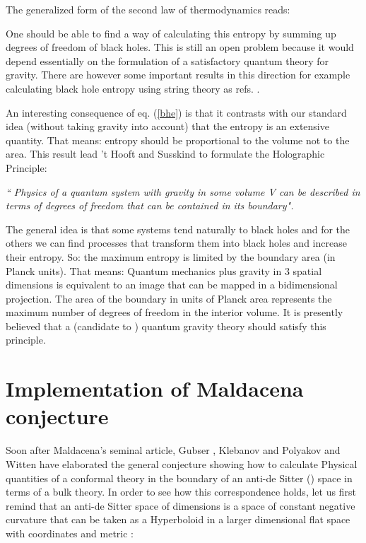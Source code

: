 \documentclass[a4paper,twocolumn,prd,groupedaddress,nofootinbib]{revtex4}
\begin{document}
\bigskip

\noindent The generalized form of the second law of thermodynamics reads:

\bigskip

\coordHE{}

\bigskip
One should be able to find a way of calculating this entropy by summing up degrees 
of freedom of black holes. This is still an open problem because it would
depend essentially on the formulation of a satisfactory quantum theory for gravity. 
There are however some important results in 
this direction for example calculating black hole entropy using string theory as 
refs. \cite{BHE1,BHE2}.



An interesting consequence of eq. (\ref{bhe}) is that it contrasts with our standard
idea (without taking gravity into account) that the entropy 
is an extensive quantity. That means: entropy should be proportional to the  
volume not to the area.  This result lead 't Hooft and Susskind to formulate 
the Holographic  Principle:

{\it `` Physics of a quantum system with gravity in some \break volume V
can be described in terms of degrees of \break freedom that can be contained
in its boundary".}

\bigskip

\noindent  The general idea is that some systems tend naturally to black holes and
for the others we can find processes that transform them into black holes and increase 
their entropy. So: the maximum entropy is limited by the boundary area (in Planck units). 
That means:  Quantum mechanics plus gravity in 3 spatial dimensions is equivalent 
to an image that can be mapped  in a bidimensional projection.
The area of the boundary in units of  Planck area represents 
the  maximum number of degrees of freedom in the interior volume.
It is presently believed that a (candidate to ) quantum gravity theory
should satisfy this principle.

\vskip 1cm

\section{Implementation of Maldacena conjecture}

\bigskip
Soon after Maldacena's seminal article, Gubser , Klebanov and Polyakov\cite{GKP} and
Witten\cite{Wi} have elaborated the general conjecture showing  how to calculate
Physical quantities of a conformal theory  in the boundary of an anti-de Sitter (\coordHE{})
space in terms of a bulk theory. In order to see how this correspondence holds,
let us first remind that an anti-de Sitter space of 
\coordHE{} dimensions \coordHE{} is a space of constant negative curvature  
that  can be taken as a Hyperboloid in a larger \coordHE{} dimensional flat space
with coordinates  \coordHE{} and metric 
\coordHE{}: 
\end{document}
